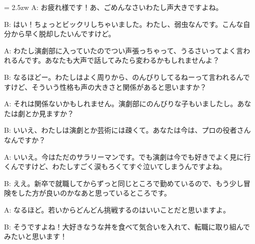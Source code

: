 \documentclass[11pt]{amsart}
\title{}
\author{}
\newenvironment{hangall}[1]{\hangindent = 2.5zw\everypar{\hangindent = 2.5zw}}{}
\begin{document}
\maketitle
\begin{hangall}{}%
A: お疲れ様です！あ、ごめんなさいわたし声大きですよね。



B: はい！ちょっとビックリしちゃいました。わたし、弱虫なんです。こんな自分から早く脱却したいんですけど。



A: わたし演劇部に入っていたのでつい声張っちゃって、うるさいってよく言われるんです。あなたも大声で話してみたら変わるかもしれませんよ？



B: なるほどー。わたしはよく周りから、のんびりしてるねーって言われるんですけど、そういう性格も声の大きさと関係があると思いますか？



A: それは関係ないかもしれません。演劇部にのんびりな子もいましたし。あなたは劇とか見ますか？



B: いいえ、わたしは演劇とか芸術には疎くて。あなたは今は、プロの役者さんなんですか？



A: いいえ。今はただのサラリーマンです。でも演劇は今でも好きでよく見に行くんですけど、わたしすごく涙もろくてすぐ泣いてしまうんですよね。



B: ええ。新卒で就職してからずっと同じところで勤めているので、もう少し冒険をした方が良いのかなあと思っているところです。



A: なるほど。若いからどんどん挑戦するのはいいことだと思いますよ。



B: そうですよね！大好きなうな丼を食べて気合いを入れて、転職に取り組んでみたいと思います！\end{hangall}
\end{document}
